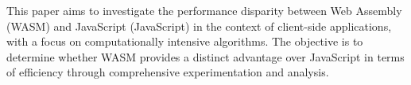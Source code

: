 This paper aims to investigate the performance disparity between Web Assembly (WASM) and JavaScript (JavaScript) in the context of client-side applications, with a focus on computationally intensive algorithms. The objective is to determine whether WASM provides a distinct advantage over JavaScript in terms of efficiency through comprehensive experimentation and analysis.